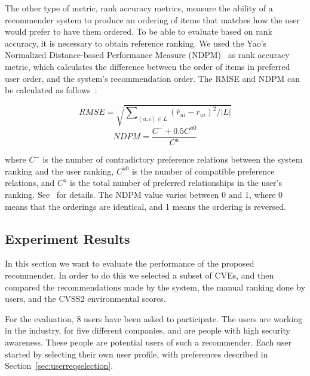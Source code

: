 {The other type of metric, rank accuracy metrics, measure the ability of a recommender system to produce an ordering of items that matches how the user would prefer to have them ordered.
To be able to evaluate based on rank accuracy, it is necessary to obtain reference ranking.
We used the Yao's Normalized Distance-based Performance Measure (NDPM)~\cite{yao:1995} as rank accuracy metric, which calculates the difference between the order of items in preferred user order, and the system's recommendation order.
The RMSE and NDPM can be calculated as follows~\cite{gunawardana:2015}:
\vspace{-0.5cm}
\begin{multicols}{2}
	\begin{equation*}
	RMSE =  \sqrt{\sum\nolimits_{(u,i)\in L} (\hat{r}_{ui}-{r}_{ui})^2 / |L| }
	\end{equation*}\break
	\begin{equation*}
	NDPM =  \frac{C^{-}+ 0.5C^{u0}}{C^u} 
	\end{equation*}
\end{multicols}
\noindent where $C^{-}$ is the number of contradictory preference relations between the system ranking and the user ranking, 
$C^{u0}$ is the number of compatible preference relations, %
and $C^u$ is the total number of preferred relationships in the user's ranking. See~\cite{gunawardana:2015} for details.
The NDPM value varies between 0 and 1, where 0 means that the orderings are identical, and 1 means the ordering is  reversed.

\subsection{Experiment Results}

In this section we want to evaluate the performance of the proposed recommender.
In order to do this we selected a subset of CVEs, and then compared the recommendations made by the system, the manual ranking done by users, and the CVSS2 environmental scores.

For the evaluation, 8 users have been asked to participate.
The users are working in the industry, for five different companies, and are people with high security awareness.
These people are potential users of such a recommender.
Each user started by selecting their own user profile, with preferences described in Section~\ref{sec:userreqselection}.

}
